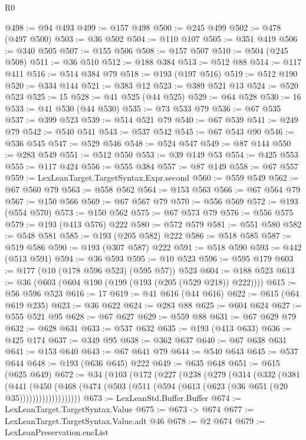 \begin{lexlean}{R0}
\begin{coremodule}
@498 := @94 @493
@499 := @157 @498
@500 := @245 @499
@502 := @478 (@497 @500)
@503 := @36 @502
@504 := @110 @107
@505 := @351 @419
@506 := @340 @505
@507 := @155 @506
@508 := @157 @507
@510 := @504 (@245 @508)
@511 := @36 @510
@512 := @188 @384
@513 := @512 @88
@514 := @117 @411
@516 := @514 @384 @79
@518 := @193 (@197 @516)
@519 := @512 @190
@520 := @334 @144
@521 := @383 @12
@523 := @389 @521 @13
@524 := @520 @523
@525 := 15
@528 := @41 @525 (@44 @525)
@529 := @64 @528
@530 := 16
@533 := @41 @530 (@44 @530)
@535 := @73 @533 @79
@536 := @67 @535
@537 := @399 @523
@539 := @514 @521 @79
@540 := @67 @539
@541 := @249 @79
@542 := @540 @541
@543 := @537 @542
@545 := @67 @543 @90
@546 := @536 @545
@547 := @529 @546
@548 := @524 @547
@549 := @87 @144
@550 := @283 @549
@551 := @512 @550
@553 := @39 @149 @53
@554 := @425 @553
@555 := @117 @424
@556 := @555 @384
@557 := @87 @149
@558 := @67 @557
@559 := LexLeanTarget.TargetSyntax.Expr.second
@560 := @559 @549
@562 := @67 @560 @79
@563 := @558 @562
@564 := @153 @563
@566 := @67 @564 @79
@567 := @150 @566
@569 := @67 @567 @79
@570 := @556 @569
@572 := @193 (@554 @570)
@573 := @150 @562
@575 := @67 @573 @79
@576 := @556 @575
@579 := @193 (@413 @576) @222
@580 := @572 @579
@581 := @551 @580
@582 := @548 @581
@585 := @193 (@205 @582) @222
@586 := @518 @585
@587 := @519 @586
@590 := @193 (@307 @587) @222
@591 := @518 @590
@593 := @442 (@513 @591)
@594 := @36 @593
@595 := @10 @523
@596 := @595 @179
@603 := @177 (@10 (@178 @596 @523) (@595 @57)) @523
@604 := @188 @523
@613 := @36 (@603 (@604 @190 (@199 (@193 (@205 (@529 @218)) @222))))
@615 := @56 @596 @523
@616 := 17
@619 := @41 @616 (@44 @616)
@622 := @615 (@64 @619 @235)
@623 := @36 @622
@624 := @283 @88
@625 := @604 @624
@627 := @555 @521 @95
@628 := @67 @627
@629 := @559 @88
@631 := @67 @629 @79
@632 := @628 @631
@633 := @537 @632
@635 := @193 (@413 @633)
@636 := @425 @174
@637 := @349 @95
@638 := @362 @637
@640 := @67 @638 @631
@641 := @153 @640
@643 := @67 @641 @79
@644 := @540 @643
@645 := @537 @644
@648 := @193 (@636 @645) @222
@649 := @635 @648
@651 := @615 (@625 @649)
@672 := @34
    (@103
      (@172
        (@227
          (@238
            (@279
              (@314
                (@332
                  (@381
                    (@441
                      (@450
                        (@468
                          (@474 (@503 (@511 (@594 (@613 (@623 (@36 @651 (@20 @35)))))))))))))))))))
@673 := LexLeanStd.Buffer.Buffer
@674 := LexLeanTarget.TargetSyntax.Value
@675 := @673 -> @674
@677 := LexLeanTarget.TargetSyntax.Value.adt @46
@678 := @2 @674
@679 := LexLeanPreservation.encList

\end{coremodule}
\end{lexlean}
